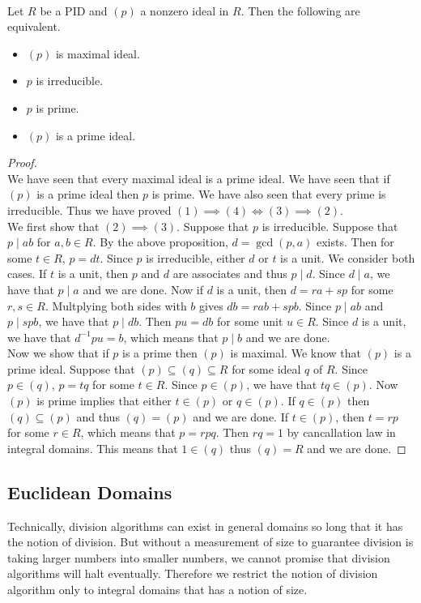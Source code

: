 \documentclass[a4paper]{article}
\begin{document}
\begin{prp}{}{}\\
Let $R$ be a PID and $(p)$ a nonzero ideal in $R$. Then the following are equivalent. 
\begin{itemize}
\item $(p)$ is maximal ideal. 
\item $p$ is irreducible. 
\item $p$ is prime. 
\item $(p)$ is a prime ideal. 
\end{itemize}
\begin{proof}\\
We have seen that every maximal ideal is a prime ideal. We have seen that if $(p)$ is a prime ideal then $p$ is prime. We have also seen that every prime is irreducible. Thus we have proved $(1)\implies(4)\iff(3)\implies(2)$. \\

We first show that $(2)\implies(3)$. Suppose that $p$ is irreducible. Suppose that $p\;|\;ab$ for $a,b\in R$. By the above proposition, $d=\gcd(p,a)$ exists. Then for some $t\in R$, $p=dt$. Since $p$ is irreducible, either $d$ or $t$ is a unit. We consider both cases. If $t$ is a unit, then $p$ and $d$ are associates and thus $p\;|\;d$. Since $d\;|\;a$, we have that $p\;|\;a$ and we are done. Now if $d$ is a unit, then $d=ra+sp$ for some $r,s\in R$. Multplying both sides with $b$ gives $db=rab+spb$. Since $p\;|\;ab$ and $p\;|\;spb$, we have that $p\;|\;db$. Then $pu=db$ for some unit $u\in R$. Since $d$ is a unit, we have that $d^{-1}pu=b$, which means that $p\;|\;b$ and we are done. \\

Now we show that if $p$ is a prime then $(p)$ is maximal. We know that $(p)$ is a prime ideal. Suppose that $(p)\subseteq(q)\subseteq R$ for some ideal $q$ of $R$. Since $p\in(q)$, $p=tq$ for some $t\in R$. Since $p\in(p)$, we have that $tq\in(p)$. Now $(p)$ is prime implies that either $t\in(p)$ or $q\in(p)$. If $q\in(p)$ then $(q)\subseteq(p)$ and thus $(q)=(p)$ and we are done. If $t\in(p)$, then $t=rp$ for some $r\in R$, which means that $p=rpq$. Then $rq=1$ by cancallation law in integral domains. This means that $1\in(q)$ thus $(q)=R$ and we are done. 
\end{proof}
\end{prp}

\subsection{Euclidean Domains}
Technically, division algorithms can exist in general domains so long that it has the notion of division. But without a measurement of size to guarantee division is taking larger numbers into smaller numbers, we cannot promise that division algorithms will halt eventually. Therefore we restrict the notion of division algorithm only to integral domains that has a notion of size. 
\end{document}
